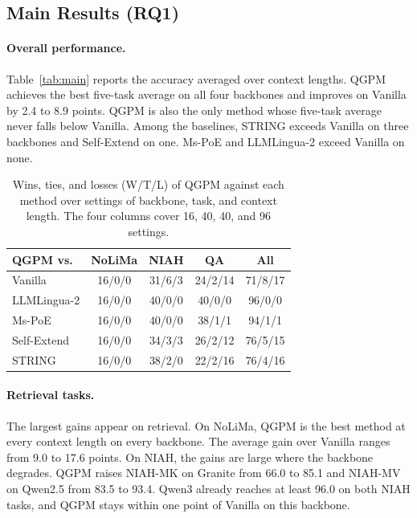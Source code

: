 \documentclass[11pt]{article}
\begin{document}
\subsection{Main Results (RQ1)}
\label{sec:exp-main}

\paragraph{Overall performance.}
Table~\ref{tab:main} reports the accuracy averaged over context lengths. QGPM achieves the best five-task average on all four backbones and improves on Vanilla by 2.4 to 8.9 points. QGPM is also the only method whose five-task average never falls below Vanilla. Among the baselines, STRING exceeds Vanilla on three backbones and Self-Extend on one. Ms-PoE and LLMLingua-2 exceed Vanilla on none.

\begin{table}[t]
\centering
\small
\setlength{\tabcolsep}{3pt}
\begin{tabular*}{\columnwidth}{@{\extracolsep{\fill}} l cccc @{}}
\toprule
QGPM vs. & NoLiMa & NIAH & QA & All \\
\midrule
Vanilla & 16/0/0 & 31/6/3 & 24/2/14 & 71/8/17 \\
LLMLingua-2 & 16/0/0 & 40/0/0 & 40/0/0 & 96/0/0 \\
Ms-PoE & 16/0/0 & 40/0/0 & 38/1/1 & 94/1/1 \\
Self-Extend & 16/0/0 & 34/3/3 & 26/2/12 & 76/5/15 \\
STRING & 16/0/0 & 38/2/0 & 22/2/16 & 76/4/16 \\
\bottomrule
\end{tabular*}
\caption{Wins, ties, and losses (W/T/L) of QGPM against each method over settings of backbone, task, and context length. The four columns cover 16, 40, 40, and 96 settings.}
\label{tab:wtl}
\end{table}

\paragraph{Retrieval tasks.}
The largest gains appear on retrieval. On NoLiMa, QGPM is the best method at every context length on every backbone. The average gain over Vanilla ranges from 9.0 to 17.6 points. On NIAH, the gains are large where the backbone degrades. QGPM raises NIAH-MK on Granite from 66.0 to 85.1 and NIAH-MV on Qwen2.5 from 83.5 to 93.4. Qwen3 already reaches at least 96.0 on both NIAH tasks, and QGPM stays within one point of Vanilla on this backbone.
\end{document}
